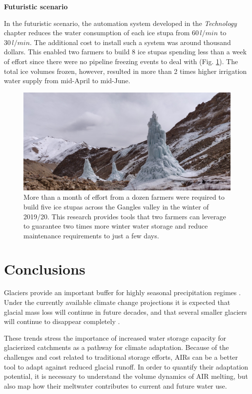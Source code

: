 \textbf{Futuristic scenario}

In the futuristic scenario, the automation system developed in the \textit{Technology} chapter reduces the water
consumption of each ice stupa from $60\,l/min$ to $30\,l/min$. The additional cost to install such a system was
around thousand dollars. This enabled two farmers to build 8 ice stupas spending less than a week of effort
since there were no pipeline freezing events to deal with (Fig. \ref{fig:icestupa_valley}). The total ice
volumes frozen, however, resulted in more than 2 times higher irrigation water supply from mid-April to
mid-June.

\begin{figure}[htb]
	\includegraphics[width=\textwidth]{figs/icestupa_valley}

  \caption{More than a month of effort from a dozen farmers were required to build five ice stupas across the
  Gangles valley in the winter of 2019/20. This research provides tools that two farmers can leverage to
  guarantee two times more winter water storage and reduce maintenance requirements to just a few days.}

	\label{fig:icestupa_valley}
\end{figure}

\section{Conclusions}

Glaciers provide an important buffer for highly seasonal precipitation regimes
\citep{kaserContributionPotentialGlaciers2010}. Under the currently available climate change projections it is
expected that glacial mass loss will continue in future decades, and that several smaller glaciers will continue
to disappear completely \citep{rabatelCurrentStateGlaciers2013}.

These trends stress the importance of increased water storage capacity for glacierized catchments as a pathway
for climate adaptation. Because of the challenges and cost related to traditional storage efforts, \ac{AIRs} can
be a better tool to adapt against reduced glacial runoff. In order to quantify their adaptation potential, it is
necessary to understand the volume dynamics of AIR melting, but also map how their meltwater contributes to
current and future water use. 


